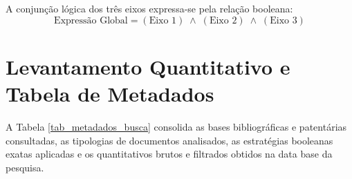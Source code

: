 A conjunção lógica dos três eixos expressa-se pela relação booleana:
\begin{equation}
\label{eq_busca_booleana}
\text{Expressão Global} = (\text{Eixo 1}) \;\land\; (\text{Eixo 2}) \;\land\; (\text{Eixo 3})
\end{equation}

\section{Levantamento Quantitativo e Tabela de Metadados}
\label{sec_tabela_metadados}

A Tabela \ref{tab_metadados_busca} consolida as bases bibliográficas e patentárias consultadas, as tipologias de documentos analisados, as estratégias booleanas exatas aplicadas e os quantitativos brutos e filtrados obtidos na data base da pesquisa.


